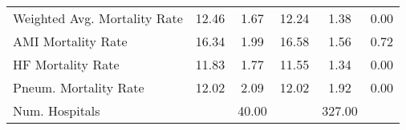 \begin{table}[h]
\begin{tabular}[t]{lccccc}
\hspace{1em}Weighted Avg. Mortality Rate & 12.46 & 1.67 & 12.24 & 1.38 & 0.00\\
\hspace{1em}AMI Mortality Rate & 16.34 & 1.99 & 16.58 & 1.56 & 0.72\\
\hspace{1em}HF Mortality Rate & 11.83 & 1.77 & 11.55 & 1.34 & 0.00\\
\hspace{1em}Pneum. Mortality Rate & 12.02 & 2.09 & 12.02 & 1.92 & 0.00\\
Num. Hospitals & & 40.00 & & 327.00 &\\
\bottomrule
\end{tabular}
\end{table}